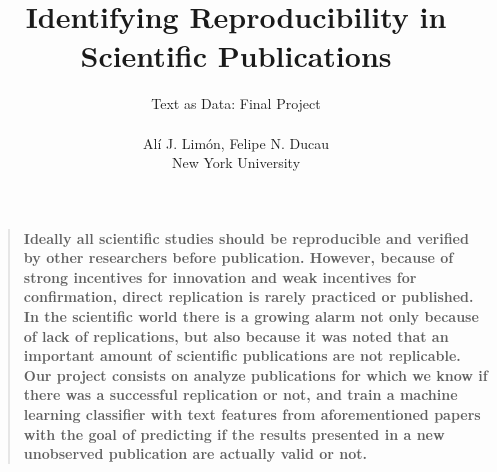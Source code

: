 \documentclass[12pt]{article}
\title{Identifying Reproducibility in Scientific Publications}
\author
{Text as Data: Final Project \\
\\
Al\'i J. Lim\'on, Felipe N. Ducau\\
\normalsize{New York University}\\
}
\date{}
\newenvironment{sciabstract}{%
\begin{quote} \bf}
{\end{quote}}
\begin{document}
 


\baselineskip24pt


\maketitle 




\begin{sciabstract}
  Ideally all scientific studies should be reproducible and verified by other researchers before publication. However, because of strong incentives for innovation and weak incentives for confirmation, direct replication is rarely practiced or published. In the scientific world there is a growing alarm not only because of lack of replications, but also because it was noted that an important amount of scientific publications are not replicable.  Our project consists on analyze publications for which we know if there was a successful replication or not, and train a machine learning classifier with text features from aforementioned papers with the goal of predicting if the results presented in a new unobserved publication are actually valid or not. 
\end{sciabstract}



\end{document}
